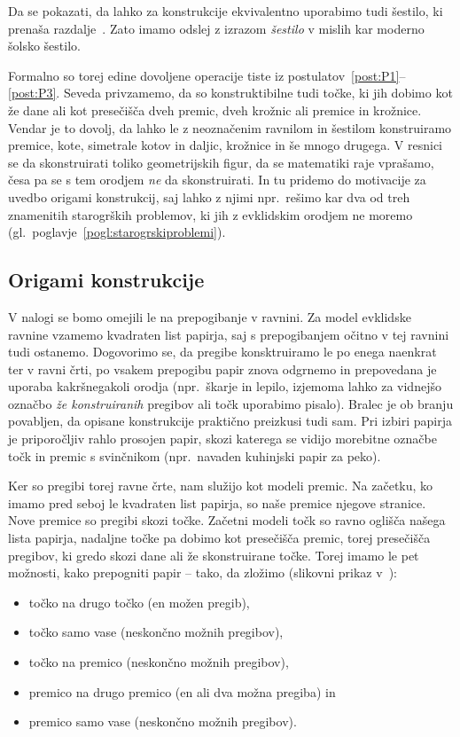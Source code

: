 \begin{opomba}
    Da se pokazati, da lahko za konstrukcije ekvivalentno uporabimo tudi šestilo, ki prenaša razdalje~\cite[str.\ 6--7]{geometricconstructions}. Zato imamo odslej z izrazom \emph{šestilo} v mislih kar moderno šolsko šestilo.
\end{opomba}

Formalno so torej edine dovoljene operacije tiste iz postulatov~\ref{post:P1}--\ref{post:P3}. Seveda privzamemo, da so konstruktibilne tudi točke, ki jih dobimo kot že dane ali kot presečišča dveh premic, dveh krožnic ali premice in krožnice. Vendar je to dovolj, da lahko le z neoznačenim ravnilom in šestilom konstruiramo premice, kote, simetrale kotov in daljic, krožnice in še mnogo drugega. V resnici se da skonstruirati toliko geometrijskih figur, da se matematiki raje vprašamo, česa pa se s tem orodjem \emph{ne} da skonstruirati. In tu pridemo do motivacije za uvedbo origami konstrukcij, saj lahko z njimi npr.\ rešimo kar dva od treh znamenitih starogrških problemov, ki jih z evklidskim orodjem ne moremo (gl.\ poglavje~\ref{pogl:starogrskiproblemi}).

\subsection{Origami konstrukcije}
\label{origami_konstrukcije}

V nalogi se bomo omejili le na prepogibanje v ravnini. Za model evklidske ravnine vzamemo kvadraten list papirja, saj s prepogibanjem očitno v tej ravnini tudi ostanemo. Dogovorimo se, da pregibe konsktruiramo le po enega naenkrat ter v ravni črti, po vsakem prepogibu papir znova odgrnemo in prepovedana je uporaba kakršnegakoli orodja (npr.\ škarje in lepilo, izjemoma lahko za vidnejšo označbo \emph{že konstruiranih} pregibov ali točk uporabimo pisalo).  Bralec je ob branju povabljen, da opisane konstrukcije praktično preizkusi tudi sam. Pri izbiri papirja je priporočljiv rahlo prosojen papir, skozi katerega se vidijo morebitne označbe točk in premic s svinčnikom (npr.\ navaden kuhinjski papir za peko).

Ker so pregibi torej ravne črte, nam služijo kot modeli premic. Na začetku, ko imamo pred seboj le kvadraten list papirja, so naše premice njegove stranice. Nove premice so pregibi skozi točke. Začetni modeli točk so ravno oglišča našega lista papirja, nadaljne točke pa dobimo kot presečišča premic, torej presečišča pregibov, ki gredo skozi dane ali že skonstruirane točke. Torej imamo le pet možnosti, kako prepogniti papir -- tako, da zložimo (slikovni prikaz v~\cite[str.\ 25--26]{hull2020}):
\begin{itemize}
    \item točko na drugo točko (en možen pregib),
    \item točko samo vase (neskončno možnih pregibov),
    \item točko na premico (neskončno možnih pregibov),
    \item premico na drugo premico (en ali dva možna pregiba) in
    \item premico samo vase (neskončno možnih pregibov).
\end{itemize}

